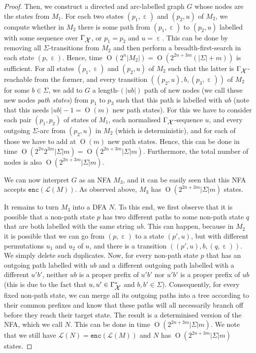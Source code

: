 \documentclass[
a4paper
]{article}
\theoremstyle{plain}
\theoremstyle{definition}
\theoremstyle{remark}
\DeclareMathOperator{\eword}{\varepsilon}
\newcommand{\varset}{\mbox{\ensuremath{\mathcal{X}}}}
\newcommand{\lang}[1]{\ensuremath{\mathcal{L}(#1)}}
\newcommand{\nrefw}[1]{\ensuremath{\mathtt{enc}(#1)}}
\DeclareMathOperator{\bigo}{O}
\begin{document}
\begin{proof}
Then, we construct a directed and arc-labelled graph $G$ whose nodes are the states from $M_1$. For each two states $(p_1, \eword)$ and $(p_2, u)$ of $M_2$, we compute whether in $M_2$ there is some path from $(p_1, \eword)$ to $(p_2, u)$ labelled with some sequence over $\Gamma_{\varset}$, or $p_1 = p_2$ and $u = \eword$. This can be done by removing all $\Sigma$-transitions from $M_2$ and then perform a breadth-first-search in each state $(p, \eword)$. Hence, time $\bigo(2^n |M_2|) = \bigo(2^{2n + 3m} (|\Sigma| + m))$ is sufficient. For all states $(p_1, \eword)$ and $(p_2, u)$ of $M_2$ such that the latter is $\Gamma_{\varset}$-reachable from the former, and every transition $((p_2, u), b, (p_3, \eword))$ of $M_2$ for some $b \in \Sigma$, we add to $G$ a length-$(|u b|)$ path of new nodes (we call these new nodes \emph{path states}) from $p_1$ to $p_3$ such that this path is labelled with $ub$ (note that this needs $|ub|-1 = \bigo(m)$ new path states). For this we have to consider each pair $(p_1, p_2)$ of states of $M_1$, each normalised $\Gamma_{\varset}$-sequence $u$, and every outgoing $\Sigma$-arc from $(p_2, u)$ in $M_2$ (which is deterministic), and for each of those we have to add at $\bigo(m)$ new path states. Hence, this can be done in time $\bigo(2^{2n} 2^{3m} |\Sigma| m) = \bigo(2^{2n + 3m} |\Sigma| m)$. Furthermore, the total number of nodes is also $\bigo(2^{2n+3m} |\Sigma| m)$.

We can now interpret $G$ as an NFA $M_3$, and it can be easily seen that this NFA accepts $\nrefw{\lang{M}}$. As observed above, $M_3$ has $\bigo(2^{2n+3m} |\Sigma| m)$ states.

It remains to turn $M_3$ into a DFA $N$. To this end, we first observe that it is possible that a non-path state $p$ has two different paths to some non-path state $q$ that are both labelled with the same string $u b$. This can happen, because in $M_2$ it is possible that we can go from $(p, \eword)$ to a state $(p', u)$, but with different permutations $u_1$ and $u_2$ of $u$, and there is a transition $((p', u), b, (q, \eword))$. We simply delete such duplicates. Now, for every non-path state $p$ that has an outgoing path labelled with $u b$ and a different outgoing path labelled with a different $u' b'$, neither $u b$ is a proper prefix of $u' b'$ nor $u' b'$ is a proper prefix of $u b$ (this is due to the fact that $u, u' \in \Gamma_{\varset}^*$ and $b, b' \in \Sigma$). Consequently, for every fixed non-path state, we can merge all its outgoing paths into a tree according to their common prefixes and know that these paths will all necessarily branch off before they reach their target state. The result is a determinised version of  the NFA, which we call $N$. This can be done in time $\bigo(2^{2n+3m} |\Sigma| m)$. We note that we still have $\lang{N} = \nrefw{\lang{M}}$ and $N$ has $\bigo(2^{2n+3m} |\Sigma| m)$ states.
\end{proof}
\end{document}
